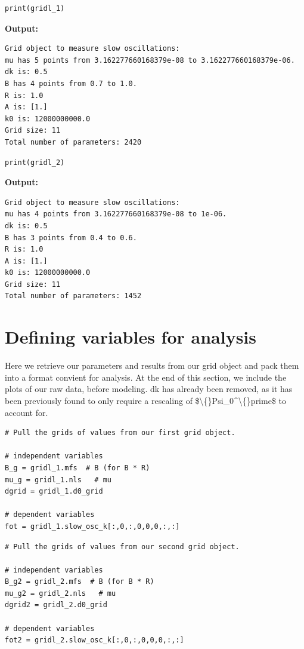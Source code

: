 \documentclass{article}
\begin{document}
\begin{lstlisting}
print(gridl_1)\end{lstlisting}

\textbf{Output:}\begin{verbatim}
Grid object to measure slow oscillations:
mu has 5 points from 3.162277660168379e-08 to 3.162277660168379e-06.
dk is: 0.5
B has 4 points from 0.7 to 1.0.
R is: 1.0
A is: [1.]
k0 is: 12000000000.0
Grid size: 11
Total number of parameters: 2420

\end{verbatim}

\begin{lstlisting}
print(gridl_2)\end{lstlisting}

\textbf{Output:}\begin{verbatim}
Grid object to measure slow oscillations:
mu has 4 points from 3.162277660168379e-08 to 1e-06.
dk is: 0.5
B has 3 points from 0.4 to 0.6.
R is: 1.0
A is: [1.]
k0 is: 12000000000.0
Grid size: 11
Total number of parameters: 1452

\end{verbatim}

\section{Defining variables for analysis}

Here we retrieve our parameters and results from our grid object and pack them into a format convient for analysis. At the end of this section, we include the plots of our raw data, before modeling. dk has already been removed, as it has been previously found to only require a rescaling of \$\textbackslash\{\}Psi\_0\textasciicircum{}\textbackslash\{\}prime\$ to account for.

\begin{lstlisting}
# Pull the grids of values from our first grid object.

# independent variables
B_g = gridl_1.mfs  # B (for B * R)
mu_g = gridl_1.nls   # mu
dgrid = gridl_1.d0_grid

# dependent variables
fot = gridl_1.slow_osc_k[:,0,:,0,0,0,:,:]\end{lstlisting}

\begin{lstlisting}
# Pull the grids of values from our second grid object.

# independent variables
B_g2 = gridl_2.mfs  # B (for B * R)
mu_g2 = gridl_2.nls   # mu
dgrid2 = gridl_2.d0_grid

# dependent variables
fot2 = gridl_2.slow_osc_k[:,0,:,0,0,0,:,:]\end{lstlisting}
\end{document}
